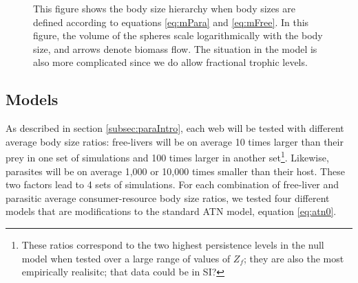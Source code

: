 \documentclass[11pt]{amsart}
\begin{document}
\begin{figure}
\caption{This figure shows the body size hierarchy when body sizes are defined according to equations \eqref{eq:mPara} and \eqref{eq:mFree}. In this figure, the volume of the spheres scale logarithmically with the body size, and arrows denote biomass flow.  The situation in the model is also more complicated since we do allow fractional trophic levels.\label{fig:bsrCartoon}}
\end{figure}

\subsection{Models\label{subsec:models}}

As described in section \ref{subsec:paraIntro}, each web will be tested with different average body size ratios: free-livers will be on average 10 times larger than their prey in one set of simulations and 100 times larger in another set\footnote{These ratios correspond to the two highest persistence levels in the null model when tested over a large range of values of $Z_f$; they are also the most empirically realisitc; that data could be in SI?}.  Likewise, parasites will be on average 1,000 or 10,000 times smaller than their host.  These two factors lead to 4 sets of simulations.  For each combination of free-liver and parasitic average consumer-resource body size ratios, we tested four different models that are modifications to the standard ATN model, equation \eqref{eq:atn0}.
\end{document}
